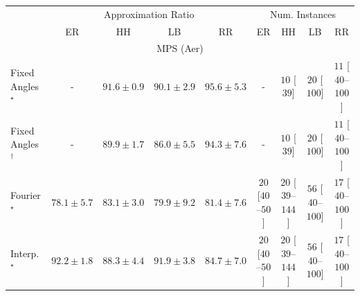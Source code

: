 \begin{tabular}{l|cccc|cccc|}
\toprule
& \multicolumn{4}{c|}{Approximation Ratio} & \multicolumn{4}{c|}{Num. Instances} \\
            & ER & HH & LB & RR & ER & HH & LB & RR \\
\midrule
\multicolumn{9}{c}{\rule{0pt}{8pt}MPS (Aer)} \\
\midrule
Fixed Angles$^\star$ & {\cellcolor[HTML]{000000}} \color[HTML]{F1F1F1} {\cellcolor{white}} \color{black} - & {\cellcolor[HTML]{790D75}} \color[HTML]{F1F1F1} $91.6\pm 0.9$ & {\cellcolor[HTML]{82147F}} \color[HTML]{F1F1F1} $90.1\pm 2.9$ & {\cellcolor[HTML]{550253}} \color[HTML]{F1F1F1} $95.6\pm 5.3$ & {\cellcolor[HTML]{000000}} \color[HTML]{F1F1F1} {\cellcolor{white}} \color{black} - & {\cellcolor[HTML]{FFF7F3}} \color[HTML]{000000} $10$ [$39$] & {\cellcolor[HTML]{FFF4F0}} \color[HTML]{000000} $20$ [$100$] & {\cellcolor[HTML]{FFF6F2}} \color[HTML]{000000} $11$ [$40$--$100$] \\
Fixed Angles$^\dagger$ & {\cellcolor[HTML]{000000}} \color[HTML]{F1F1F1} {\cellcolor{white}} \color{black} - & {\cellcolor[HTML]{821781}} \color[HTML]{F1F1F1} $89.9\pm 1.7$ & {\cellcolor[HTML]{873897}} \color[HTML]{F1F1F1} $86.0\pm 5.5$ & {\cellcolor[HTML]{61065D}} \color[HTML]{F1F1F1} $94.3\pm 7.6$ & {\cellcolor[HTML]{000000}} \color[HTML]{F1F1F1} {\cellcolor{white}} \color{black} - & {\cellcolor[HTML]{FFF7F3}} \color[HTML]{000000} $10$ [$39$] & {\cellcolor[HTML]{FFF4F0}} \color[HTML]{000000} $20$ [$100$] & {\cellcolor[HTML]{FFF6F2}} \color[HTML]{000000} $11$ [$40$--$100$] \\
Fourier$^\star$ & {\cellcolor[HTML]{8C75B6}} \color[HTML]{F1F1F1} $78.1\pm 5.7$ & {\cellcolor[HTML]{8950A4}} \color[HTML]{F1F1F1} $83.1\pm 3.0$ & {\cellcolor[HTML]{8C68AF}} \color[HTML]{F1F1F1} $79.9\pm 9.2$ & {\cellcolor[HTML]{8B5CAA}} \color[HTML]{F1F1F1} $81.4\pm 7.6$ & {\cellcolor[HTML]{FFF4F0}} \color[HTML]{000000} $20$ [$40$--$50$] & {\cellcolor[HTML]{FFF4F0}} \color[HTML]{000000} $20$ [$39$--$144$] & {\cellcolor[HTML]{FEEBE8}} \color[HTML]{000000} $56$ [$40$--$100$] & {\cellcolor[HTML]{FFF5F1}} \color[HTML]{000000} $17$ [$40$--$100$] \\
Interp.$^\star$ & {\cellcolor[HTML]{740B70}} \color[HTML]{F1F1F1} $92.2\pm 1.8$ & {\cellcolor[HTML]{84258B}} \color[HTML]{F1F1F1} $88.3\pm 4.4$ & {\cellcolor[HTML]{760C71}} \color[HTML]{F1F1F1} $91.9\pm 3.8$ & {\cellcolor[HTML]{88449E}} \color[HTML]{F1F1F1} $84.7\pm 7.0$ & {\cellcolor[HTML]{FFF4F0}} \color[HTML]{000000} $20$ [$40$--$50$] & {\cellcolor[HTML]{FFF4F0}} \color[HTML]{000000} $20$ [$39$--$144$] & {\cellcolor[HTML]{FEEBE8}} \color[HTML]{000000} $56$ [$40$--$100$] & {\cellcolor[HTML]{FFF5F1}} \color[HTML]{000000} $17$ [$40$--$100$] \\

\end{tabular}
